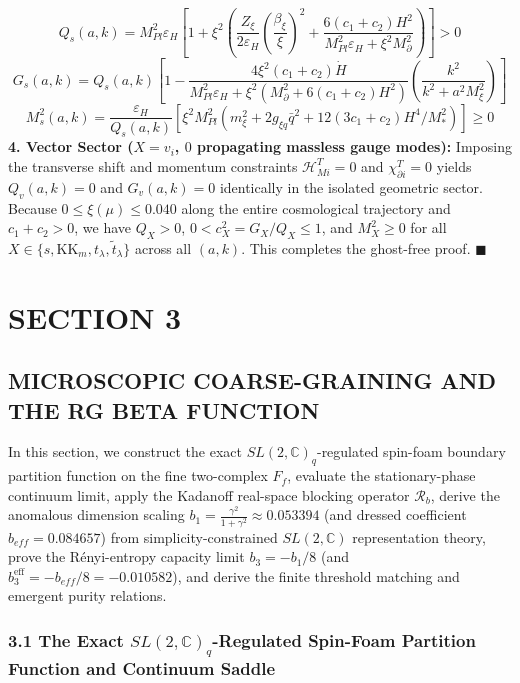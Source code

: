 \documentclass[aps,prd,onecolumn,superscriptaddress,nofootinbib,longbibliography,10pt]{revtex4-2}
\begin{document}
{{  \[ Q_s(a,k) = M_{Pl}^2 \varepsilon_H \left[ 1 + \xi^2\left( \frac{Z_\xi}{2\varepsilon_H}\left(\frac{\beta_\xi}{\xi}\right)^2 + \frac{6(c_1 + c_2)H^2}{M_{Pl}^2 \varepsilon_H + \xi^2 M_\partial^2} \right) \right] > 0 \]
  \[ G_s(a,k) = Q_s(a,k)\left[ 1 - \frac{4\xi^2(c_1 + c_2)\dot{H}}{M_{Pl}^2\varepsilon_H + \xi^2(M_\partial^2 + 6(c_1 + c_2)H^2)}\left(\frac{k^2}{k^2 + a^2 M_\xi^2}\right) \right] \]
  \[ M_s^2(a,k) = \frac{\varepsilon_H}{Q_s(a,k)}\left[ \xi^2 M_{Pl}^2\left(m_\xi^2 + 2g_{\xi q}\bar{q}^2 + 12(3c_1 + c_2)H^4/M_*^2\right) \right] \ge 0 \]
  \textbf{4. Vector Sector (\(X = v_i\), \(0\) propagating massless gauge modes):} Imposing the transverse shift and momentum constraints \(\mathcal{H}_{Mi}^T = 0\) and \(\chi_{\partial i}^T = 0\) yields \(Q_v(a,k) = 0\) and \(G_v(a,k) = 0\) identically in the isolated geometric sector. Because \(0 \le \xi(\mu) \le 0.040\) along the entire cosmological trajectory and \(c_1 + c_2 > 0\), we have \(Q_X > 0\), \(0 < c_X^2 = G_X/Q_X \le 1\), and \(M_X^2 \ge 0\) for all \(X \in \{s, \text{KK}_m, t_\lambda, \tilde{t}_\lambda\}\) across all \((a,k)\). This completes the ghost-free proof. \(\blacksquare\)




 

  
\section*{SECTION 3}

  
\subsection*{MICROSCOPIC COARSE-GRAINING AND THE RG BETA FUNCTION}

  In this section, we construct the exact \(SL(2,\mathbb{C})_q\)-regulated spin-foam boundary partition function on the fine two-complex \(F_f\), evaluate the stationary-phase continuum limit, apply the Kadanoff real-space blocking operator \(\mathcal{R}_b\), derive the anomalous dimension scaling \(b_1 = \frac{\gamma^2}{1+\gamma^2} \approx 0.053394\) (and dressed coefficient \(b_{eff} = 0.084657\)) from simplicity-constrained \(SL(2,\mathbb{C})\) representation theory, prove the Rényi-entropy capacity limit \(b_3 = -b_1/8\) (and \(b_3^{\text{eff}} = -b_{eff}/8 = -0.010582\)), and derive the finite threshold matching and emergent purity relations.


  
  
\subsubsection*{3.1 The Exact \(SL(2,\mathbb{C})_q\)-Regulated Spin-Foam Partition Function and Continuum Saddle}

}}
\end{document}
